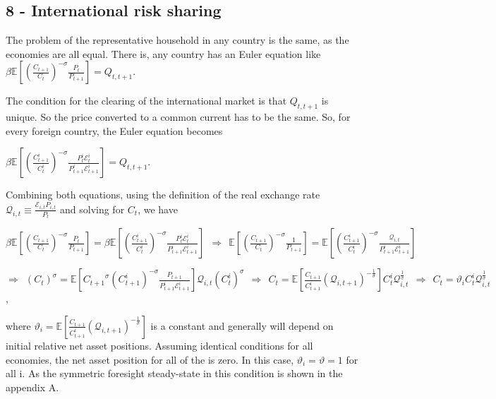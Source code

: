 \documentclass[
]{article}
\begin{document}
\hypertarget{international-risk-sharing}{%
\subsection{8 - International risk
sharing}\label{international-risk-sharing}}

The problem of the representative household in any country is the same,
as the economies are all equal. There is, any country has an Euler
equation like
\(\displaystyle \beta \mathbb{E} \left[ \left( \frac{C_{t+1}}{C_t} \right)^{-\sigma} \frac{P_t}{P_{t+1}}\right]= Q_{t,t+1}\).

The condition for the clearing of the international market is that
\(Q_{t,t+1}\) is unique. So the price converted to a common current has
to be the same. So, for every foreign country, the Euler equation
becomes

\(\displaystyle \beta \mathbb{E} \left[ \left( \frac{C_{t+1}^i}{C_t^i} \right)^{-\sigma} \frac{P_t^i \mathcal{E}_t^i}{P_{t+1}^i \mathcal{E}_{t+1}^i}\right] = Q_{t,t+1}\).

Combining both equations, using the definition of the real exchange rate
\(\displaystyle \mathcal{Q}_{i,t} \equiv \frac{\mathcal{E}_{i,t}P_{i,t}}{P_t}\)
and solving for \(C_t\), we have

\(\displaystyle \beta \mathbb{E} \left[ \left( \frac{C_{t+1}}{C_t} \right)^{-\sigma} \frac{P_t}{P_{t+1}}\right] = \beta \mathbb{E} \left[ \left( \frac{C_{t+1}^i}{C_t^i} \right)^{-\sigma} \frac{P_t^i \mathcal{E}_t^i}{P_{t+1}^i \mathcal{E}_{t+1}^i}\right] \ \ \Rightarrow \ \ \mathbb{E} \left[ \left( \frac{C_{t+1}}{C_t} \right)^{-\sigma} \frac{1}{P_{t+1}}\right] = \mathbb{E} \left[ \left( \frac{C_{t+1}^i}{C_t^i} \right)^{-\sigma} \frac{\mathcal{Q}_{i,t}}{P_{t+1}^i \mathcal{E}_{t+1}^i}\right]\)

\(\displaystyle \Rightarrow \ \ (C_t)^\sigma = \mathbb{E} \left[ {C_{t+1}}^\sigma \left( C_{t+1}^i \right)^{-\sigma} \frac{P_{t+1}}{P_{t+1}^i \mathcal{E}_{t+1}^i}\right]\mathcal{Q}_{i,t}(C_t^i)^\sigma \ \ \Rightarrow \ \ C_t = \mathbb{E} \left[ \frac{C_{t+1}}{C_{t+1}^i} (\mathcal{Q}_{i,t+1})^{-\frac{1}{\sigma}}\right] C_t^i \mathcal{Q}_{i,t}^\frac{1}{\sigma} \ \ \Rightarrow \ \ C_t = \vartheta_i C_t^i \mathcal{Q}_{i,t}^\frac{1}{\sigma}\),

where
\(\displaystyle \vartheta_i = \mathbb{E} \left[ \frac{C_{t+1}}{C_{t+1}^i} (\mathcal{Q}_{i,t+1})^{-\frac{1}{\sigma}}\right]\)
is a constant and generally will depend on initial relative net asset
positions. Assuming identical conditions for all economies, the net
asset position for all of the is zero. In this case,
\(\vartheta_i = \vartheta = 1\) for all i. As the symmetric foresight
steady-state in this condition is shown in the appendix A.
\end{document}

